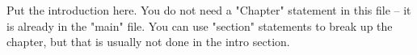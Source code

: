 
Put the introduction here.  You do not need a "Chapter" statement 
in this file --  it is already in the "main" file.  You can use
"section" statements to break up the chapter, but that is usually 
not done in the intro section.

